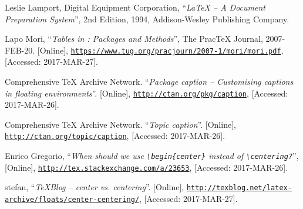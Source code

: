 \documentclass[article,a4paper,oneside,10pt]{memoir}
\begin{document}
\newpage
\begin{thebibliography}{1}

        Leslie Lamport, Digital Equipment Corporation,
        ``\emph{\LaTeX{} -- A Document Preparation System}'',
        2nd Edition,
        1994,
        Addison-Wesley Publishing Company.

        Lapo Mori,
        ``\emph{Tables in \LaTeXe: Packages and Methods}'',
        The Prac\TeX{} Journal,
        2007-FEB-20.
        [Online],
        \href{https://www.tug.org/pracjourn/2007-1/mori/mori.pdf}
             {\nolinkurl{https://www.tug.org/pracjourn/2007-1/mori/mori.pdf}},
        [Accessed: 2017-MAR-27].

        Comprehensive \TeX{} Archive Network.
        ``\emph{Package caption -- Customising captions in floating environments}''.
        [Online],
        \href{http://ctan.org/pkg/caption}{\nolinkurl{http://ctan.org/pkg/caption}},
        [Accessed: 2017-MAR-26].

        Comprehensive \TeX{} Archive Network.
        ``\emph{Topic caption}''.
        [Online],
        \href{http://ctan.org/topic/caption}{\nolinkurl{http://ctan.org/topic/caption}},
        [Accessed: 2017-MAR-26].

        Enrico Gregorio,
        ``\emph{When should we use \texttt{\textbackslash{}begin\{center\}} 
        instead of \texttt{\textbackslash{}centering?}}'',
        [Online],
        \href{http://tex.stackexchange.com/a/23653}
             {\nolinkurl{http://tex.stackexchange.com/a/23653}},
        [Accessed: 2017-MAR-26].
    
        stefan,
        ``\emph{\TeX{}Blog -- center vs. centering}''.
        [Online],
        \href{http://texblog.net/latex-archive/floats/center-centering/}
             {\nolinkurl{http://texblog.net/latex-archive/floats/center-centering/}},
        [Accessed: 2017-MAR-27].

\end{thebibliography}
\end{document}
